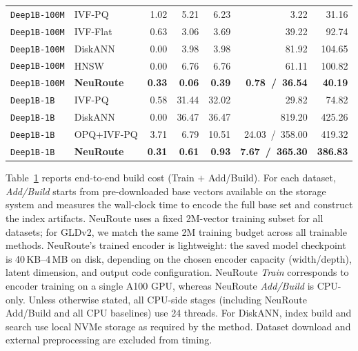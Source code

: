 \documentclass[sigconf, nonacm]{acmart}
\begin{document}
\begin{table}[t]
{\begin{tabular}{l l r r r r r}
\midrule
\texttt{Deep1B-100M} & IVF-PQ   & 1.02 & 5.21 & 6.23 & 3.22  & 31.16 \\
\texttt{Deep1B-100M} & IVF-Flat & 0.63 & 3.06 & 3.69 & 39.22 & 92.74 \\
\texttt{Deep1B-100M} & DiskANN  & 0.00 & 3.98 & 3.98 & 81.92 & 104.65 \\
\texttt{Deep1B-100M} & HNSW     & 0.00 & 6.76 & 6.76 & 61.11 & 100.82 \\
\texttt{Deep1B-100M} & \textbf{NeuRoute} & \textbf{0.33} & \textbf{0.06} & \textbf{0.39} & \textbf{\mbox{0.78 / 36.54}} & \textbf{40.19} \\
\midrule
\texttt{Deep1B-1B} & IVF-PQ & 0.58 & 31.44 & 32.02 & 29.82 & 74.82 \\
\texttt{Deep1B-1B} & DiskANN & 0.00 & 36.47 & 36.47 & 819.20 & 425.26 \\
\texttt{Deep1B-1B} & OPQ+IVF-PQ & 3.71 & 6.79 & 10.51 & \mbox{24.03 / 358.00} & 419.32 \\
\texttt{Deep1B-1B} & \textbf{NeuRoute} & \textbf{0.31} & \textbf{0.61} & \textbf{0.93} & \textbf{\mbox{7.67 / 365.30}} & \textbf{386.83} \\
\bottomrule
\end{tabular}
} %
\label{tab:build_cost_breakdown}
\end{table}




Table~\ref{tab:build_cost_breakdown} reports end-to-end build cost (Train $+$ Add/Build).
For each dataset, \emph{Add/Build} starts from pre-downloaded base vectors available on the storage system and measures the wall-clock time to encode the full base set and construct the index artifacts.
NeuRoute uses a fixed 2M-vector training subset for all datasets; for GLDv2, we match the same 2M training budget across all trainable methods.
NeuRoute's trained encoder is lightweight: the saved model checkpoint is 40\,KB--4\,MB on disk, depending on the chosen encoder capacity (width/depth), latent dimension, and output code configuration.
NeuRoute \emph{Train} corresponds to encoder training on a single A100 GPU, whereas NeuRoute \emph{Add/Build} is CPU-only.
Unless otherwise stated, all CPU-side stages (including NeuRoute Add/Build and all CPU baselines) use 24 threads.
For DiskANN, index build and search use local NVMe storage as required by the method.
Dataset download and external preprocessing are excluded from timing.
\end{document}
